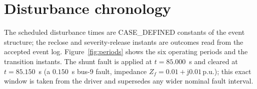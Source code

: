 \documentclass[12pt,a4paper]{article}
\newcommand{\pu}{\,\mathrm{p.u.}}
\begin{document}
\section{Disturbance chronology}\label{sec:chrono}
The scheduled disturbance times are \textsf{CASE\_DEFINED} constants of the
event structure; the reclose and severity-release instants are outcomes read
from the accepted event log. Figure~\ref{fig:periods} shows the six operating
periods and the transition instants. The shunt fault is applied at $t=85.000$~s
and cleared at $t=85.150$~s (a $0.150$~s bus-9 fault, impedance
$Z_f=0.01+\mathrm{j}0.01\pu$); this exact window is taken from the driver and
supersedes any wider nominal fault interval.
\end{document}
